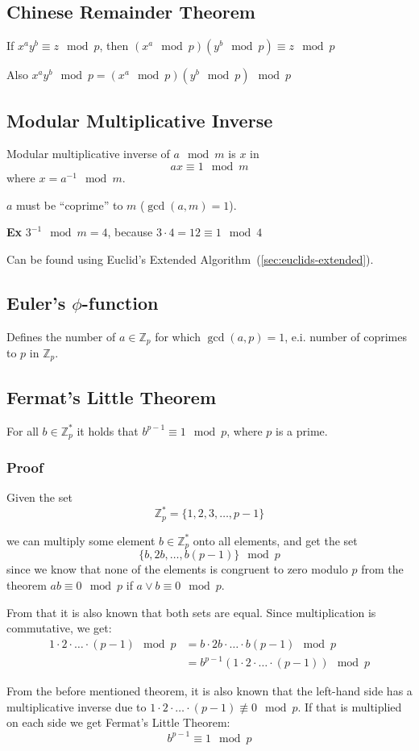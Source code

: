 \subsection{Chinese Remainder Theorem}
\label{sec:crm}
If $x^ay^b \equiv z \mod p$, then $(x^a \mod p)(y^b \mod p) \equiv z \mod p$

Also $x^ay^b \mod p = (x^a \mod p)(y^b \mod p) \mod p$

\subsection{Modular Multiplicative Inverse}
\label{sec:modular-mult-inverse}
Modular multiplicative inverse of $a \mod m$ is $x$ in
\[ ax \equiv 1 \mod m \]
where $x = a^{-1} \mod m$.

$a$ must be ``coprime'' to $m$ ($\gcd(a, m) = 1$).

\textbf{Ex} $3^{-1} \mod m = 4$, because $3 \cdot 4 = 12 \equiv 1 \mod 4$

Can be found using Euclid's Extended Algorithm~(\ref{sec:euclids-extended}).

\subsection{Euler's $\phi$-function}
\label{sec:eulers-phi}
Defines the number of $a \in \mathbb{Z}_p$ for which $\gcd(a, p) = 1$,
e.i. number of coprimes to $p$ in $\mathbb{Z}_p$.

\subsection{Fermat's Little Theorem}
\label{sec:fermats-little}
For all $b \in \mathbb{Z}_p^*$ it holds that $b^{p-1} \equiv 1 \mod
p$, where $p$ is a prime.

\subsubsection*{Proof}
Given the set
\[ \mathbb{Z}_p^* = \{1,2,3,\ldots,p-1\} \]

we can multiply some element $b \in \mathbb{Z}_p^*$ onto all elements,
and get the set
\[ \{b,2b,\ldots,b(p-1)\} \mod p \]
since we know that none of the elements is congruent to zero modulo
$p$ from the theorem $ab \equiv 0 \mod p$ if $a \lor b \equiv 0 \mod
p$.

From that it is also known that both sets are equal. Since
multiplication is commutative, we get:
\begin{align*}
  1 \cdot 2 \cdot \ldots \cdot (p - 1) \mod p &= b \cdot 2b \cdot \ldots
  \cdot b(p-1) \mod p\\
  &= b^{p-1}(1\cdot 2 \cdot \ldots \cdot (p - 1)) \mod p
\end{align*}

From the before mentioned theorem, it is also known that the left-hand
side has a multiplicative inverse due to $1 \cdot 2 \cdot \ldots \cdot
(p - 1) \not \equiv 0 \mod p$. If that is multiplied on each side we
get Fermat's Little Theorem:
\[b^{p-1} \equiv 1 \mod p\]